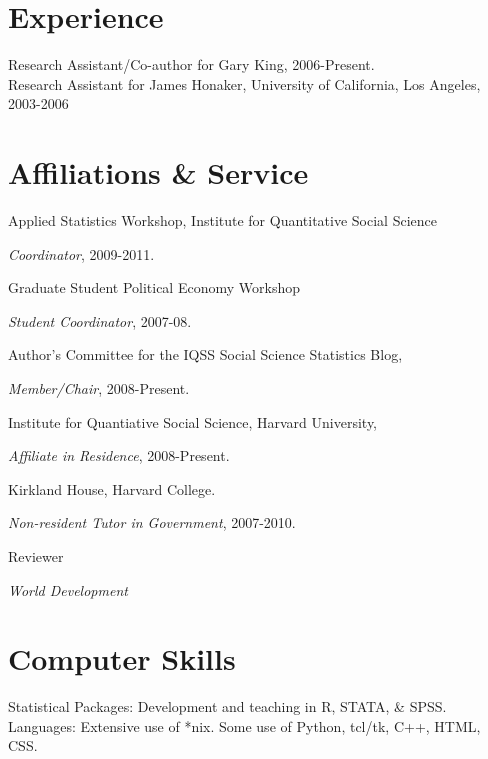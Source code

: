 \documentclass[margin,line]{res}
\newenvironment{list1}{
  \begin{list}{\ding{113}}{%
      \setlength{\itemsep}{0in}
      \setlength{\parsep}{0in} \setlength{\parskip}{0in}
      \setlength{\topsep}{0in} \setlength{\partopsep}{0in} 
      \setlength{\leftmargin}{0.83 cm}}}{\end{list}}
\begin{document}
\begin{resume}
\section{\sc Experience}
Research Assistant/Co-author for Gary King, 2006-Present.\\
Research Assistant for James Honaker, University of California, Los Angeles, 2003-2006

\section{\sc Affiliations \& Service}

Applied Statistics Workshop, Institute for Quantitative
Social Science 
\begin{list1}
\item[] \emph{Coordinator}, 2009-2011.
\end{list1}
\vspace{-1em}
Graduate Student Political Economy Workshop
\begin{list1} 
\item[] \emph{Student Coordinator}, 2007-08.
\end{list1} \vspace{-1em}
Author's Committee for the IQSS Social Science Statistics Blog,
\begin{list1}
\item[]\emph{Member/Chair}, 2008-Present.
\end{list1} \vspace{-1em}
Institute for Quantiative Social Science, Harvard University,
\begin{list1}
\item[] \emph{Affiliate in Residence}, 2008-Present.
\end{list1} \vspace{-1em}
 Kirkland House, Harvard College. 
\begin{list1}
\item[] \emph{Non-resident Tutor in Government}, 2007-2010.
\end{list1} \vspace{-1em}
Reviewer
\begin{list1}
\item[] \emph{World Development}
\end{list1}

\section{\sc Computer Skills} 
Statistical Packages:  Development and teaching in R, STATA, \& SPSS.\\
Languages: Extensive use of *nix. Some use of Python, tcl/tk, C++, HTML, CSS.


\end{resume}
\end{document}

